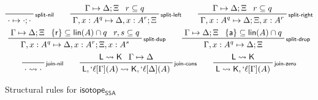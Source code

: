 \documentclass[acmsmall,screen,review]{acmart}
\newcommand{\ms}[1]{\ensuremath{\mathsf{#1}}}
\newcommand{\lbl}[1]{{`#1}}
\newcommand{\csplits}[3]{#1 \mapsto #2;#3}
\newcommand{\cwk}[2]{#1 \mapsto #2}
\newcommand{\lwk}[2]{#1 \rightsquigarrow #2}
\newcommand{\tlin}[2]{#2 \subseteq \ms{lin}(#1)}
\newcommand{\ltlin}[3]{#3 \subseteq \ms{lin}(#1) \cap #2}
\newcommand{\thyp}[3]{#1: {#2}^{#3}}
\newcommand{\lhyp}[3]{#1[#2](#3)}
\newcommand{\llhyp}[3]{\lhyp{\lbl{#1}}{#2}{#3}}
\newcommand{\rle}[1]{{\scriptsize\textsf{#1}}}
\newcommand{\taff}{{\{\ms{a}\}}}
\newcommand{\trel}{{\{\ms{r}\}}}
\newcommand{\isotopessa}{\ms{isotope_{SSA}}}
\begin{document}
\begin{figure}
  \begin{gather*}    
    \prftree[r]{\rle{split-nil}}{\csplits{\cdot}{\cdot}{\cdot}} \qquad
    \prftree[r]{\rle{split-left}}
      {\csplits{\Gamma}{\Delta}{\Xi}}
      {r \subseteq q}
      {\csplits{\Gamma, \thyp{x}{A}{q}}{\Delta, \thyp{x}{A}{r}}{\Xi}} \qquad
    \prftree[r]{\rle{split-right}}
      {\csplits{\Gamma}{\Delta}{\Xi}}
      {r \subseteq q}
      {\csplits{\Gamma, \thyp{x}{A}{q}}{\Delta}{\Xi, \thyp{x}{A}{r}}} \\
    \prftree[r]{\rle{split-dup}}
      {\csplits{\Gamma}{\Delta}{\Xi}}
      {\ltlin{A}{q}{\trel}}
      {r, s \subseteq q}
      {\csplits{\Gamma, \thyp{x}{A}{q}}{\Delta, \thyp{x}{A}{r}}{\Xi, \thyp{x}{A}{s}}}
      \qquad
    \prftree[r]{\rle{split-drop}}
      {\csplits{\Gamma}{\Delta}{\Xi}}
      {\ltlin{A}{q}{\taff}}
      {\csplits{\Gamma, \thyp{x}{A}{q}}{\Delta}{\Xi}}
      \\
    \prftree[r]{\rle{join-nil}}{\lwk{\cdot}{\cdot}} \qquad
    \prftree[r]{\rle{join-cons}}
      {\lwk{\ms{L}}{\ms{K}}}
      {\cwk{\Gamma}{\Delta}}
      {\lwk{\ms{L}, \llhyp{\ell}{\Gamma}{A}}{\ms{K}, \llhyp{\ell}{\Delta}{A}}} 
      \qquad
    \prftree[r]{\rle{join-zero}}
      {\lwk{\ms{L}}{\ms{K}}}
      {\lwk{\ms{L}}{\ms{K}, \llhyp{\ell}{\Gamma}{A}}} 
  \end{gather*}
  \caption{Structural rules for \isotopessa}
  \label{fig:ssa-structural}
\end{figure}
\end{document}
